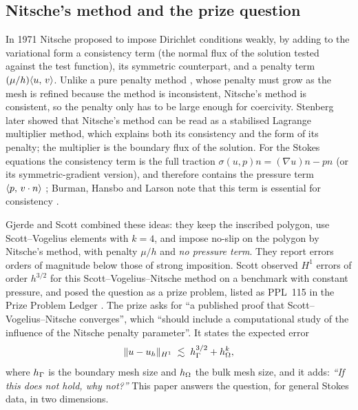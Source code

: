 \subsection{Nitsche's method and the prize question}
In 1971 Nitsche \cite{Nitsche1971} proposed to impose Dirichlet conditions weakly, by adding to the variational form a consistency term (the normal flux of the solution tested against the test function), its symmetric counterpart, and a penalty term $(\mu/h)\langle u,\, v\rangle$. Unlike a pure penalty method \cite{Babuska1973}, whose penalty must grow as the mesh is refined because the method is inconsistent, Nitsche's method is consistent, so the penalty only has to be large enough for coercivity. Stenberg \cite{Stenberg1995} later showed that Nitsche's method can be read as a stabilised Lagrange multiplier method, which explains both its consistency and the form of its penalty; the multiplier is the boundary flux of the solution. For the Stokes equations the consistency term is the full traction $\sigma(u,p)n=(\nabla u)n-pn$ (or its symmetric-gradient version), and therefore contains the pressure term $\langle p,\, v\cdot n\rangle$ \cite{FreundStenberg1995,Stenberg1995,Becker2002,BurmanHansbo2014}; Burman, Hansbo and Larson note that this term is essential for consistency \cite{BurmanHansboLarson2019Stokes}.

Gjerde and Scott \cite{GjerdeScott2024} combined these ideas: they keep the inscribed polygon, use Scott--Vogelius elements with $k=4$, and impose no-slip on the polygon by Nitsche's method, with penalty $\mu/h$ and \emph{no pressure term}. They report errors orders of magnitude below those of strong imposition. Scott observed $H^1$ errors of order $h^{3/2}$ for this Scott--Vogelius--Nitsche method on a benchmark with constant pressure, and posed the question as a prize problem, listed as PPL~115 in the Prize Problem Ledger \cite{ScottPrize}. The prize asks for ``a published proof that Scott--Vogelius--Nitsche converges'', which ``should include a computational study of the influence of the Nitsche penalty parameter''. It states the expected error
\[
\lVert u-u_h\rVert_{H^1}\;\lesssim\;h_\Gamma^{3/2}+h_\Omega^k,
\]
where $h_\Gamma$ is the boundary mesh size and $h_\Omega$ the bulk mesh size, and it adds: \emph{``If this does not hold, why not?''} This paper answers the question, for general Stokes data, in two dimensions.

